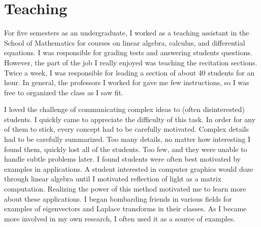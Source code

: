 \documentclass[twoside,leqno, 12pt]{article}
\begin{document}
\section{Teaching} 

For five semesters as an undergraduate, I worked as a teaching assistant in the School of Mathematics for courses on linear algebra, calculus, and differential equations.  I was responsible for grading tests and answering students questions.  However, the part of the job I really enjoyed was teaching the recitation sections.  Twice a week, I was responsible for leading a section of about 40 students for an hour.  In general, the professors I worked for gave me few instructions, so I was free to organized the class as I saw fit.  

I loved the challenge of communicating complex ideas to (often disinterested) students.  I quickly came to appreciate the difficulty of this task.  In order for any of them to stick, every concept had to be carefully motivated.  Complex details had to be carefully summarized.  Too many details, no matter how interesting I found them, quickly lost all of the students.  Too few, and they were unable to handle subtle problems later.  I found students were often best motivated by examples in applications.  A student interested in computer graphics would doze through linear algebra until I motivated reflection of light as a matrix computation.  Realizing the power of this method motivated me to learn more about these applications.  I began bombarding friends in various fields for examples of eigenvectors and Laplace transforms in their classes.  As I became more involved in my own research, I often used it as a source of examples.  



\end{document}
